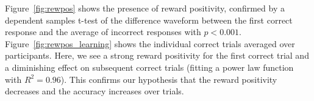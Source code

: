 Figure~\ref{fig:rewpos} shows the presence of reward positivity, confirmed by a 
dependent samples t-test of the difference waveform between the first correct 
response and the average of incorrect responses with $p < 0.001$.  
Figure~\ref{fig:rewpos_learning} shows the individual correct trials averaged 
over participants. Here, we see a strong reward positivity for the first 
correct trial and a diminishing effect on subsequent correct trials (fitting a 
power law function with $R^2 = 0.96$). This confirms our hypothesis that the 
reward positivity decreases and the \tvt accuracy increases over trials.
